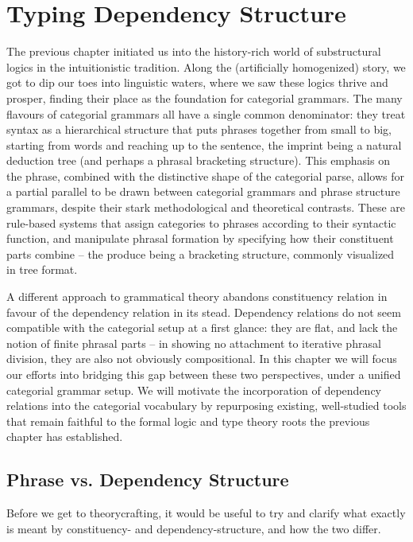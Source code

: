 \chapter{Typing Dependency Structure}
\label{chapter:chapter_2}


The previous chapter initiated us into the history-rich world of substructural logics in the intuitionistic tradition.
Along the (artificially homogenized) story, we got to dip our toes into linguistic waters, where we saw these logics thrive and prosper, finding their place as the foundation for categorial grammars.
The many flavours of categorial grammars all have a single common denominator: they treat syntax as a hierarchical structure that puts phrases together from small to big, starting from words and reaching up to the sentence, the imprint being a natural deduction tree (and perhaps a phrasal bracketing structure).
This emphasis on the phrase, combined with the distinctive shape of the categorial parse, allows for a partial parallel to be drawn between categorial grammars and phrase structure grammars, despite their stark methodological and theoretical contrasts.
These are rule-based systems that assign categories to phrases according to their syntactic function, and manipulate phrasal formation by specifying how their constituent parts combine -- the produce being a bracketing structure, commonly visualized in tree format.

A different approach to grammatical theory abandons constituency relation in favour of the dependency relation in its stead.
Dependency relations do not seem compatible with the categorial setup at a first glance: they are flat, and lack the notion of finite phrasal parts -- in showing no attachment to iterative phrasal division, they are also not obviously compositional.
In this chapter we will focus our efforts into bridging this gap between these two perspectives, under a unified categorial grammar setup.
We will motivate the incorporation of dependency relations into the categorial vocabulary by repurposing existing, well-studied tools that remain faithful to the formal logic and type theory roots the previous chapter has established.

\section{Phrase vs. Dependency Structure}
Before we get to theorycrafting, it would be useful to try and clarify what exactly is meant by constituency- and dependency-structure, and how the two differ.

